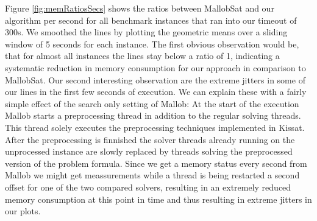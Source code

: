 \documentclass[12pt,a4paper,twoside]{scrartcl}
\numberwithin{equation}{section}
\begin{document}
Figure \ref{fig:memRatiosSecs} shows the ratios between MallobSat and our algorithm per second for all benchmark instances that ran into our timeout of 300s. We smoothed the lines by plotting the geometric means over a sliding window of 5 seconds for each instance. 
The first obvious observation would be, that for almost all instances the lines stay below a ratio of 1, indicating a systematic reduction in memory consumption for our approach in comparison to MallobSat.
Our second interesting observation are the extreme jitters in some of our lines in the first few seconds of execution. We can explain these with a fairly simple effect of the search only setting of Mallob: At the start of the execution Mallob starts a preprocessing thread in addition to the regular solving threads. This thread solely executes the preprocessing techniques implemented in Kissat. After the preprocessing is finnished the solver threads already running on the unprocessed instance are slowly replaced by threads solving the preprocessed version of the problem formula. Since we get a memory status every second from Mallob we might get meassurements while a thread is being restarted a second offset for one of the two compared solvers, resulting in an extremely reduced memory consumption at this point in time and thus resulting in extreme jitters in our plots.
\end{document}
